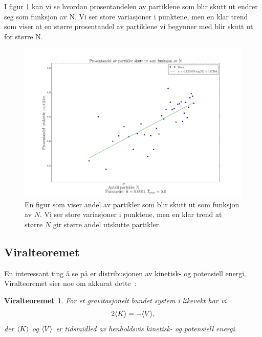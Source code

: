 \documentclass[11pt]{article}
\newtheorem*{viralthm}{Viralteoremet}
\begin{document}
\begin{multicols}{2}

I figur \ref{fig:prosentandel-utskutte} kan vi se hvordan prosentandelen
av partiklene som blir skutt ut endrer seg som funksjon av N. Vi ser
store variasjoner i punktene, men en klar trend som viser at en større
prosentandel av partiklene vi begynner med blir skutt ut for større N. 

\end{multicols}
\begin{figure}[ht!]
  \centering
  \includegraphics[width=\textwidth]{../fig/prosentandel.png}
  \caption{\label{fig:prosentandel-utskutte} En figur som viser andel av partikler
  som blir skutt ut som funksjon av $N$. Vi ser store variasjoner i punktene, men en klar
  trend at større $N$ gir større andel utskutte partikler.}
\end{figure}
\begin{multicols}{2}



\subsection{Viralteoremet}
En interessant ting å se på er distribusjonen av kinetisk- og
potensiell energi. Viralteoremet sier noe om akkurat dette~\cite{viralteoremet-wiki}:

\begin{viralthm}
  For et gravitasjonelt bundet system i likevekt har vi 
\begin{align}
  2\langle K \rangle = -\langle V \rangle,
\end{align}
der $\langle K \rangle$ og $\langle V \rangle$ er tidsmidled av henholdsvis
kinetisk- og potensiell energi.
\end{viralthm} 

\end{multicols}
\end{document}
